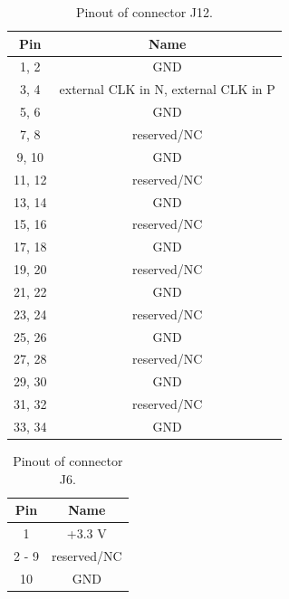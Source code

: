 	\begin{table}
	\begin{small}
		\begin{center}
			\begin{tabular}{|c|c|}
				\hline
				Pin & Name\\
				\hline\hline
				1, 2 & GND\\
				\hline
				3, 4 & external CLK in N, external CLK in P\\
				\hline
				5, 6 & GND\\
				\hline
				7, 8 & reserved/NC\\
				\hline
				9, 10 & GND\\
				\hline
				11, 12 & reserved/NC\\
				\hline
				13, 14 & GND\\
				\hline
				15, 16 & reserved/NC\\
				\hline
				17, 18 & GND\\
				\hline
				19, 20 & reserved/NC\\
				\hline
				21, 22 & GND\\
				\hline
				23, 24 & reserved/NC\\
				\hline
				25, 26 & GND\\
				\hline
				27, 28 & reserved/NC\\
				\hline
				29, 30 & GND\\
				\hline
				31, 32 & reserved/NC\\
				\hline
				33, 34 & GND\\
				\hline
			\end{tabular}
			\caption{Pinout of connector J12.}
			\label{J12}
		\end{center}
	\end{small}
	\end{table}

	\begin{table}
	\begin{small}
		\begin{center}
			\begin{tabular}{|c|c|}
				\hline
				Pin & Name\\
				\hline\hline
				1 & +3.3 V\\
				\hline
				2 - 9 & reserved/NC\\
				\hline
				10 & GND\\
				\hline
			\end{tabular}
			\caption{Pinout of connector J6.}
			\label{J6}
		\end{center}
	\end{small}
	\end{table}

